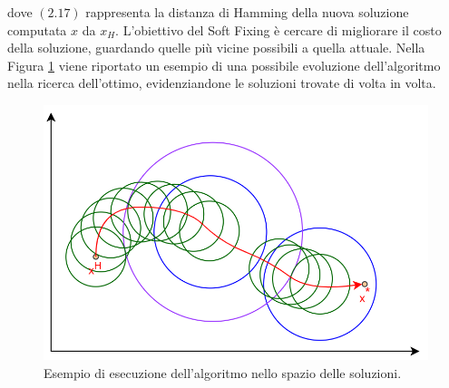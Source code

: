 dove $(2.17)$ rappresenta la distanza di Hamming della nuova soluzione computata $x$ da $x_H$. L'obiettivo del Soft Fixing è cercare di migliorare il costo della soluzione, guardando quelle più vicine possibili a quella attuale. Nella Figura \ref{local_exe} viene riportato un esempio di una possibile evoluzione dell'algoritmo nella ricerca dell'ottimo, evidenziandone le soluzioni trovate di volta in volta.
\begin{figure}[H] 
\begin{center} 
  \includegraphics[scale=0.38]{Images/local_exe}
  \caption{\footnotesize{Esempio di esecuzione dell'algoritmo nello spazio delle soluzioni.}} \label{local_exe} 
\end{center} 
\end{figure}